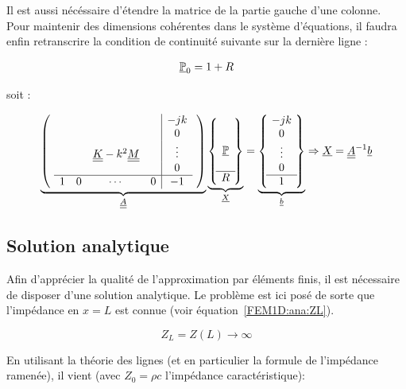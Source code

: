 Il est aussi nécéssaire d'étendre la matrice de la partie gauche d'une colonne. Pour maintenir des dimensions cohérentes
dans le système d'équations, il faudra enfin retranscrire la condition de continuité suivante sur la dernière ligne :

\begin{equation*}
	\underline{\mathbb{P}}_0 = 1 + R
\end{equation*}

soit :

\begin{equation*}
	\underbrace{\left(~
	\begin{array}{cccc|c}
		&&&&-jk\\
		&&&&0\\
		& & \underline{\underline{K}} - k^2\underline{\underline{M}} & &\vdots \\
		&&&&0\\\hline
			1 & 0 & \cdots & 0& -1 \\
	\end{array}
	~\right)}_{\underline{\underline{A}}}
	\underbrace{\left\{~
	\begin{matrix}
		\\
		\\
		\underline{\mathbb{P}}\\
		\\\hline
		R
	\end{matrix}
	~\right\}}_{\underline{X}} = 
	\underbrace{\left\{~
	\begin{matrix}
		-jk\\
		0\\
		\vdots\\
		0\\\hline
		1
	\end{matrix}
	~\right\}}_{\underline{b}} \Rightarrow
	\underline{X} = \underline{\underline{A}}^{-1}\underline{b}
\end{equation*}

\subsection{Solution analytique}

Afin d'apprécier la qualité de l'approximation par éléments finis, il est nécessaire de disposer d'une solution
analytique. Le problème est ici posé de sorte que l'impédance en $x=L$ est connue (voir équation~\eqref{FEM1D:ana:ZL}).

\begin{equation}
	Z_L = Z(L) \rightarrow \infty \label{FEM1D:ana:ZL}
\end{equation}

En utilisant la théorie des lignes (et en particulier la formule de l'impédance ramenée), il vient (avec $Z_0 =
\rho c$ l'impédance caractéristique):


